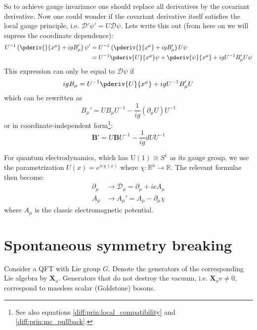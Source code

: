 	So to achieve gauge invariance one should replace all derivatives by the covariant derivative. Now one could wonder if the covariant derivative itself satisfies the local gauge principle, i.e. $\mathcal{D}'\psi' = U\mathcal{D}\psi$. Lets write this out (from here on we will supress the coordinate dependence):
	\begin{align}
		U^{-1}\left(\pderiv{}{x^\mu} + igB_\mu'\right)\psi' &= U^{-1}\left(\pderiv{}{x^\mu} + igB_\mu'\right)U\psi\nonumber\\
		&= U^{-1}\pderiv{U}{x^\mu}\psi + \pderiv{\psi}{x^\mu} + igU^{-1}B_\mu'U\psi
	\end{align}
	This expression can only be equal to $\mathcal{D}\psi$ if
	\begin{equation}
		igB_\mu = U^{-1}\pderiv{U}{x^\mu} + igU^{-1}B_\mu'U
	\end{equation}
	which can be rewritten as
	\begin{equation}
		B_\mu' = UB_\mu U^{-1} - \frac{1}{ig}(\partial_\mu U)U^{-1}
	\end{equation}
	or in coordinate-independent form\footnote{See also equations \ref{diff:prin:local_compatibility} and \ref{diff:prin:mc_pullback}.}:
	\begin{equation}
		\boxed{\mathbf{B}' = U\mathbf{B}U^{-1} - \frac{1}{ig}dUU^{-1}}
	\end{equation}
	
	\begin{example}[QED]
		For quantum electrodynamics, which has U$(1)\cong S^1$ as its gauge group, we use the parametrization $U(x) = e^{ie\chi(x)}$ where $\chi:\mathbb{R}^n\rightarrow\mathbb{R}$. The relevant formulae then become:
		\begin{align}
			\partial_\mu &\longrightarrow \mathcal{D}_\mu = \partial_\mu + ieA_\mu\\
			A_\mu &\longrightarrow A_\mu' = A_\mu - \partial_\mu\chi
		\end{align}
		where $A_\mu$ is the classic electromagnetic potential.
	\end{example}
	
\section{Spontaneous symmetry breaking}

	\begin{theorem}[Goldstone]
		Consider a QFT with Lie group $G$. Denote the generators of the corresponding Lie algebra by $\mathbf{X}_a$. Generators that do not destroy the vacuum\footnotemark, i.e. $\mathbf{X}_av\neq0$, correspond to massless scalar (Goldstone) bosons.
	\end{theorem}
